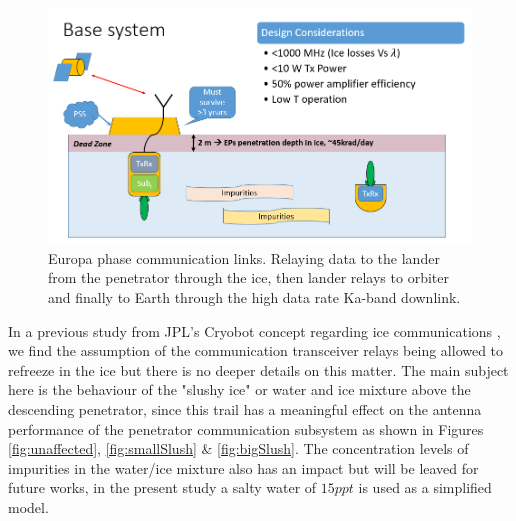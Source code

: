 \begin{figure}[H]
	\centering
	\includegraphics[width=\textwidth]{figures/comms/comm-baseDesc}
	\caption{Europa phase communication links. Relaying data to the lander from the penetrator through the ice, then lander relays to orbiter and finally to Earth through the high data rate Ka-band downlink.}
	\label{fig:europa-comms}
\end{figure}






In a previous study from JPL's Cryobot concept regarding ice communications \cite{iceLink-scott}, we find the assumption of the communication transceiver relays being allowed to refreeze in the ice but there is no deeper details on this matter. The main subject here is the behaviour of the "slushy ice" or water and ice mixture above the descending penetrator, since this trail has a meaningful effect on the antenna performance of the penetrator communication subsystem as shown in Figures \ref{fig:unaffected}, \ref{fig:smallSlush} \& \ref{fig:bigSlush}. The concentration levels of impurities in the water/ice mixture also has an impact but will be leaved for future works, in the present study a salty water of $15ppt$ is used as a simplified model.

